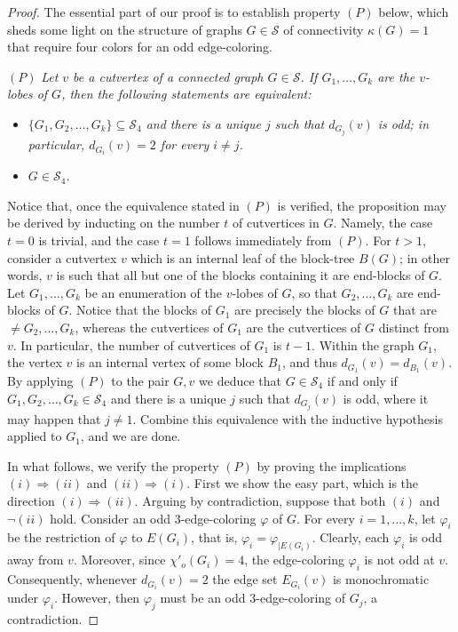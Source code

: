 \documentclass[a4paper,12pt]{article}
\numberwithin{equation}{section}
\begin{document}
\begin{proof}
The essential part of our proof is to establish property $(P)$ below, which sheds some light on the structure of graphs $G\in\mathcal{S}$ of connectivity $\kappa(G)=1$ that require four colors for an odd edge-coloring.

\medskip

\noindent $(P)$ \textit{Let $v$ be a cutvertex of a connected graph $G\in\mathcal{S}$. If $G_1,\ldots,G_k$ are the $v$-lobes of $G$, then the following statements are equivalent:}
\begin{itemize}
\item[$(i)$]  \textit{$\{G_1,G_2,\ldots,G_k\}\subseteq\mathcal{S}_4$  and there is a unique $j$ such that $d_{G_j}(v)$ is odd; in particular, $d_{G_i}(v)=2$ for every $i\neq j$.}
\item[$(ii)$] \textit{$G\in\mathcal{S}_4$.}
\end{itemize}


Notice that, once the equivalence stated in $(P)$ is verified, the proposition may be derived by inducting on the number $t$ of cutvertices in $G$. Namely, the case $t=0$ is trivial, and the case $t=1$ follows immediately from $(P)$. For $t>1$, consider a cutvertex $v$ which is an internal leaf of the block-tree $B(G)$; in other words, $v$ is such that all but one of the blocks containing it are end-blocks of $G$. Let $G_1,\ldots,G_k$ be an enumeration of the $v$-lobes of $G$, so that $G_2,\ldots,G_k$ are end-blocks of $G$. Notice that the blocks of $G_1$ are precisely the blocks of $G$ that are $\neq G_2,\ldots,G_k$, whereas the cutvertices of $G_1$ are the cutvertices of $G$ distinct from $v$. In particular, the number of cutvertices of $G_1$ is $t-1$. Within the graph $G_1$, the vertex $v$ is an internal vertex of some block $B_1$, and thus $d_{G_1}(v)=d_{B_1}(v)$. By applying $(P)$ to the pair $G,v$ we deduce that $G\in\mathcal{S}_4$ if and only if  $G_1,G_2,\ldots,G_k\in\mathcal{S}_4$ and there is a unique $j$ such that $d_{G_j}(v)$ is odd, where it may happen that $j\neq1$. Combine this equivalence with the inductive hypothesis applied to $G_1$, and we are done.

\medskip

In what follows, we verify the property $(P)$ by proving the implications $(i)\Rightarrow(ii)$ and $(ii)\Rightarrow(i)$.
First we show the easy part, which is the direction $(i)\Rightarrow(ii)$. Arguing by contradiction, suppose that both $(i)$ and $\neg(ii)$  hold. Consider an odd $3$-edge-coloring $\varphi$ of $G$. For every $i=1,\ldots,k$, let $\varphi_i$ be the restriction of $\varphi$ to $E(G_i)$, that is, $\varphi_i=\varphi_{|E(G_i)}$. Clearly, each $\varphi_i$ is odd away from $v$. Moreover, since $\chi'_o(G_i)=4$, the edge-coloring $\varphi_i$  is not odd at $v$. Consequently, whenever $d_{G_i}(v)=2$ the edge set $E_{G_i}(v)$ is monochromatic under $\varphi_i$. However, then $\varphi_j$ must be an odd $3$-edge-coloring of $G_j$, a contradiction.


\end{proof}
\end{document}
